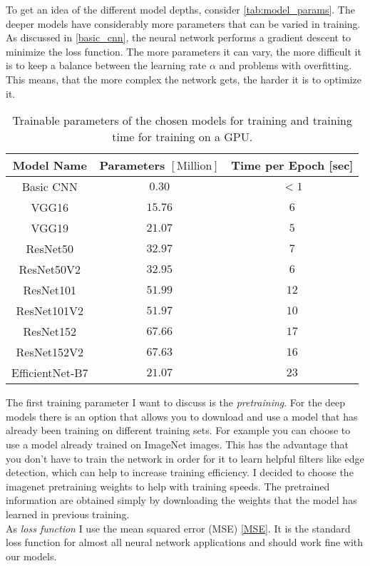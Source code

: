 To get an idea of the different model depths, consider \autoref{tab:model_params}. The deeper models have considerably more parameters that can be varied in training. As discussed in \cref{basic_cnn}, the neural network performs a gradient descent to minimize the loss function. The more parameters it can vary, the more difficult it is to keep a balance between the learning rate $\alpha$ and problems with overfitting. This means, that the more complex the network gets, the harder it is to optimize it.


\begin{table*}[h]
\centering
\begin{tabular}{@{}ccc@{}}\toprule
Model Name & Parameters $[\text{Million}]$ & Time per Epoch [sec] \\
\midrule
Basic CNN & $0.30$ & $<1$\\
VGG16 & $15.76$ & $6$\\
VGG19 & $21.07$ & $5$\\
ResNet50 & $32.97$ & $7$\\
ResNet50V2 & $32.95$ & $6$\\
ResNet101 & $51.99$ & $12$\\
ResNet101V2 & $51.97$ & $10$\\
ResNet152 & $67.66$ & $17$\\
ResNet152V2 & $67.63$ & $16$\\
EfficientNet-B7 & $21.07$ & $23$\\
\bottomrule
\end{tabular}
\caption{Trainable parameters of the chosen models for training and training time for training on a GPU.}
\label{tab:model_params}
\end{table*}

The first training parameter I want to discuss is the \textit{pretraining}. For the deep models there is an option that allows you to download and use a model that has already been training on different training sets. For example you can choose to use a model already trained on ImageNet images. This has the advantage that you don't have to train the network in order for it to learn helpful filters like edge detection, which can help to increase training efficiency. I decided to choose the imagenet pretraining weights to help with training speeds. The pretrained information are obtained simply by downloading the weights that the model has learned in previous training. \\

As \textit{loss function} I use the mean squared error (MSE) \eqref{MSE}. It is the standard loss function for almost all neural network applications and should work fine with our models.

